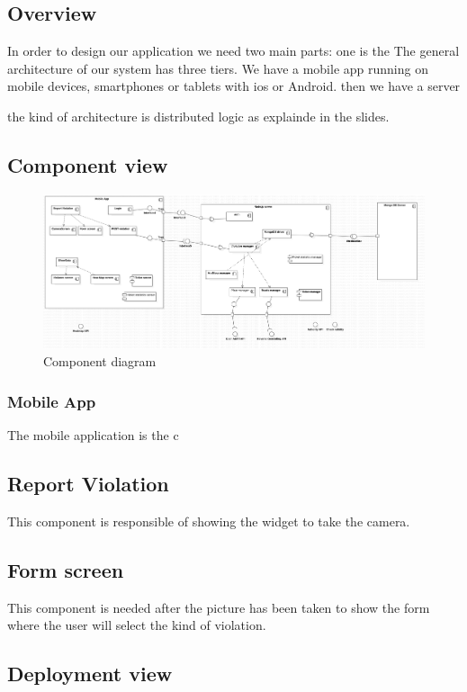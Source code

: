 \subsection{Overview}
In order to design our application we need two main parts: one is the
The general architecture of our system has three tiers.
We have a mobile app running on mobile devices, smartphones or tablets with ios or Android.
then we have a server

the kind of architecture is distributed logic as explainde in the slides.


\subsection{Component view}

\begin{figure}
\centering
\includegraphics[width=\textwidth]{Images/ComponentDiagram1.png}
\caption{\label{fig:compdiag} Component diagram}
\end{figure}



\subsubsection{Mobile App}
The mobile application is the c

\subsection{Report Violation}
This component is responsible of showing the widget to take the camera.
\subsection{Form screen}
This component is needed after the picture has been taken to show the form where the user will select the kind of violation.

\subsection{Deployment view}


